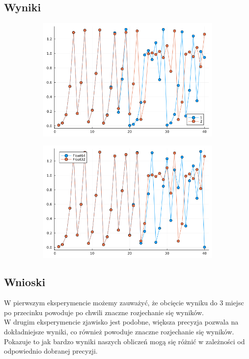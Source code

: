 \documentclass{article}
\def\v{0.47}
\begin{document}
\subsection*{Wyniki}
	\begin{figure}[H]
		\centering
		\begin{subfigure}[b]{\v\linewidth}
			\includegraphics[width=\linewidth]{graphs/5.1.png}
		\end{subfigure}
		\begin{subfigure}[b]{\v\linewidth}
			\includegraphics[width=\linewidth]{graphs/5.2.png}
		\end{subfigure}
	\end{figure}
\subsection*{Wnioski}
	W pierwszym eksperymencie możemy zauważyć, że obcięcie wyniku do 3 miejsc po przecinku powoduje po chwili znaczne rozjechanie się wyników. \\
	W drugim eksperymencie zjawisko jest podobne, większa precyzja pozwala na dokładniejsze wyniki, co również powoduje znaczne rozjechanie się wyników. \\
	Pokazuje to jak bardzo wyniki naszych obliczeń mogą się różnić w zależności od odpowiednio dobranej precyzji.
\end{document}

